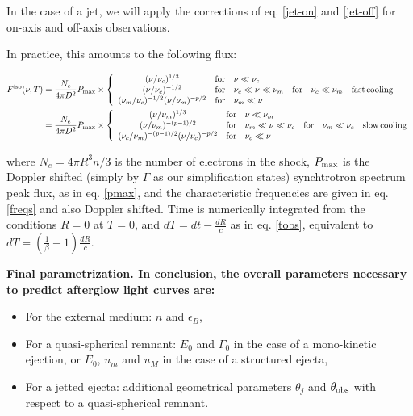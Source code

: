 In the case of a jet, we will apply the corrections of eq. \ref{jet-on} and \ref{jet-off} for on-axis and off-axis observations.

In practice, this amounts to the following flux:

\begin{align}\label{flux}
F^{\rm{iso}}(\nu, T) &= \frac{N_e}{4\pi D^2} P_{\rm{max}} \times \left\{ \begin{array}{clllll}
                                    (\nu/\nu_c)^{1/3} & \rm{for} & \nu \ll \nu_c & & & \\
                                    (\nu/\nu_c)^{-1/2} & \rm{for} & \nu_c \ll \nu \ll \nu_m & \rm{for} & \nu_c \ll \nu_m & \rm{fast\,cooling} \\
                                    (\nu_m/\nu_c)^{-1/2}(\nu/\nu_m)^{-p/2} & \rm{for} & \nu_m \ll \nu & & & \\
                                    \end{array}\right. \\
                   &= \frac{N_e}{4\pi D^2} P_{\rm{max}} \times \left\{ \begin{array}{clllll}
                                    (\nu/\nu_m)^{1/3} & \rm{for} & \nu \ll \nu_m & & &\\
                                    (\nu/\nu_m)^{-(p-1)/2} & \rm{for} & \nu_m \ll \nu \ll \nu_c & \rm{for} & \nu_m \ll \nu_c &\rm{slow\,cooling} \\
                                    (\nu_c/\nu_m)^{-(p-1)/2}(\nu/\nu_c)^{-p/2} & \rm{for} & \nu_c \ll \nu & & & \\
                                    \end{array}\right.
\end{align}

where $N_e = 4 \pi R^3 n / 3$ is the number of electrons in the shock, $P_\rm{max}$ is the Doppler shifted (simply by $\Gamma$ as our simplification states) synchtrotron spectrum peak flux, as in eq. \ref{pmax}, and the characteristic frequencies are given in eq. \ref{freqs} and also Doppler shifted. Time is numerically integrated from the conditions $R = 0$ at $T = 0$, and $dT = dt - \frac{dR}{c}$ as in eq. \ref{tobs}, equivalent to $dT = \left( \frac{1}{\beta} - 1\right)\frac{dR}{c}$.

\bf{Final parametrization. }In conclusion, the overall parameters necessary to predict afterglow light curves are:

\begin{itemize}
	\item For the external medium: $n$ and $\epsilon_B$,
	\item For a quasi-spherical remnant: $E_0$ and $\Gamma_0$ in the case of a mono-kinetic ejection, or $E_0$, $u_m$ and $u_M$ in the case of a structured ejecta,
	\item For a jetted ejecta: additional geometrical parameters $\theta_j$ and $\theta_{\rm{obs}}$ with respect to a quasi-spherical remnant.

\end{itemize}



